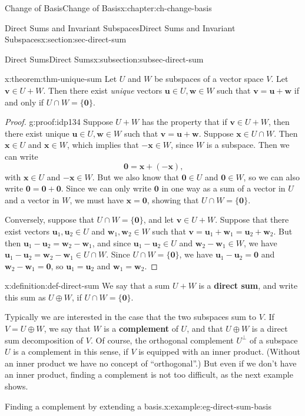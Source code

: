 \documentclass[oneside,10pt,]{book}
\newcommand{\terminology}[1]{\textbf{#1}}
\numberwithin{equation}{section}
\newcommand{\uu}{\mathbf{u}}
\newcommand{\vv}{\mathbf{v}}
\newcommand{\ww}{\mathbf{w}}
\newcommand{\xx}{\mathbf{x}}
\newcommand{\zer}{\mathbf{0}}
\begin{document}
\begin{chapterptx}{Change of Basis}{}{Change of Basis}{}{}{x:chapter:ch-change-basis}
\begin{sectionptx}{Direct Sums and Invariant Subspaces}{}{Direct Sums and Invariant Subspaces}{}{}{x:section:sec-direct-sum}
\begin{subsectionptx}{Direct Sums}{}{Direct Sums}{}{}{x:subsection:subsec-direct-sum}
\begin{theorem}{}{}{x:theorem:thm-unique-sum}%
Let \(U\) and \(W\) be subspaces of a vector space \(V\). Let \(\vv\in U+W\). Then there exist \emph{unique} vectors \(\uu\in U, \ww\in W\) such that \(\vv = \uu+\ww\) if and only if \(U\cap W = \{\mathbf{0}\}\).%
\end{theorem}
\begin{proof}{}{g:proof:idp134}
Suppose \(U+W\) has the property that if \(\vv\in U+W\), then there exist unique \(\uu\in U,\ww\in W\) such that \(\vv=\uu+\ww\). Suppose \(\mathbf{x}\in U\cap W\). Then \(\xx\in U\) and \(\xx\in W\), which implies that \(-\xx\in W\), since \(W\) is a subspace. Then we can write%
\begin{equation*}
\mathbf{0} = \xx + (-\xx)\text{,}
\end{equation*}
with \(\xx\in U\) and \(-\xx\in W\). But we also know that \(\mathbf{0}\in U\) and \(\mathbf{0}\in W\), so we can also write \(\mathbf{0}=\mathbf{0}+\mathbf{0}\). Since we can only write \(\mathbf{0}\) in one way as a sum of a vector in \(U\) and a vector in \(W\), we must have \(\xx=\mathbf{0}\), showing that \(U\cap W = \{\mathbf{0}\}\).%
\par
Conversely, suppose that \(U\cap W = \{\zer\}\), and let \(\vv\in U+W\). Suppose that there exist vectors \(\uu_1,\uu_2\in U\) and \(\ww_1,\ww_2\in W\) such that \(\vv = \uu_1+\ww_1=\uu_2+\ww_2\). But then \(\uu_1-\uu_2=\ww_2-\ww_1\), and since \(\uu_1-\uu_2\in U\) and \(\ww_2-\ww_1\in W\), we have \(\uu_1-\uu_2=\ww_2-\ww_1\in U\cap W\). Since \(U\cap W=\{\zer\}\), we have \(\uu_1-\uu_2=\zer\) and \(\ww_2-\ww_1=\zer\), so \(\uu_1=\uu_2\) and \(\ww_1=\ww_2\).%
\end{proof}
\begin{definition}{}{x:definition:def-direct-sum}%
We say that a sum \(U+W\) is a \terminology{direct sum}, and write this sum as \(U\oplus W\), if \(U\cap W = \{\mathbf{0}\}\).%
\end{definition}
Typically we are interested in the case that the two subspaces sum to \(V\). If \(V = U\oplus W\), we say that \(W\) is a \terminology{complement} of \(U\), and that \(U\oplus W\) is a direct sum decomposition of \(V\). Of course, the orthogonal complement \(U^\bot\) of a subspace \(U\) is a complement in this sense, if \(V\) is equipped with an inner product. (Without an inner product we have no concept of ``orthogonal''.) But even if we don't have an inner product, finding a complement is not too difficult, as the next example shows.%
\begin{example}{Finding a complement by extending a basis.}{x:example:eg-direct-sum-basis}%

\end{example}
\end{subsectionptx}
\end{sectionptx}
\end{chapterptx}
\end{document}
